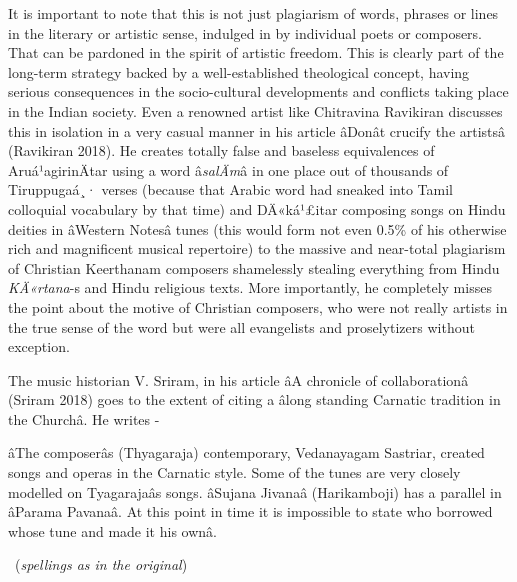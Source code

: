 It is important to note that this is not just plagiarism of words, phrases or lines in the literary or artistic sense, indulged in by individual poets or composers. That can be pardoned in the spirit of artistic freedom. This is clearly part of the long-term strategy backed by a well-established theological concept, having serious consequences in the socio-cultural developments and conflicts taking place in the Indian society. Even a renowned artist like Chitravina Ravikiran discusses this in isolation in a very casual manner in his article âDonât crucify the artistsâ (Ravikiran 2018). He creates totally false and baseless equivalences of Aruá¹agirinÄtar using a word â\textit{salÄm}â in one place out of thousands of Tiruppugaá¸· verses (because that Arabic word had sneaked into Tamil colloquial vocabulary by that time) and DÄ«ká¹£itar composing songs on Hindu deities in âWestern Notesâ tunes (this would form not even 0.5\% of his otherwise rich and magnificent musical repertoire) to the massive and near-total plagiarism of Christian Keerthanam composers shamelessly stealing everything from Hindu \textit{KÄ«rtana}-s and Hindu religious texts. More importantly, he completely misses the point about the motive of Christian composers, who were not really artists in the true sense of the word but were all evangelists and proselytizers without exception.

The music historian V. Sriram, in his article âA chronicle of collaborationâ (Sriram 2018) goes to the extent of citing a âlong standing Carnatic tradition in the Churchâ. He writes -

\begin{myquote}
âThe composerâs (Thyagaraja) contemporary, Vedanayagam Sastriar, created songs and operas in the Carnatic style. Some of the tunes are very closely modelled on Tyagarajaâs songs. âSujana Jivanaâ (Harikamboji) has a parallel in âParama Pavanaâ. At this point in time it is impossible to state who borrowed whose tune and made it his ownâ. 

~\hfill (\textit{spellings as in the original})
\end{myquote}

